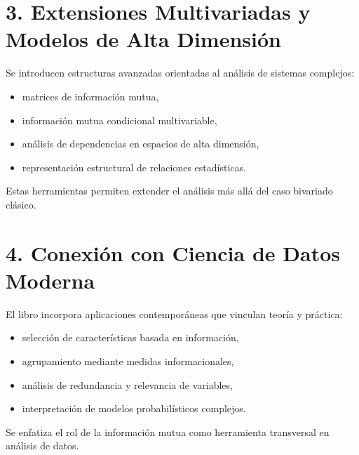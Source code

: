 \documentclass[letterpaper,10pt,english]{jupyterBook}
\begin{document}
\section{3. Extensiones Multivariadas y Modelos de Alta Dimensión}
\label{\detokenize{00_frontmatter/contributions:extensiones-multivariadas-y-modelos-de-alta-dimension}}
\sphinxAtStartPar
Se introducen estructuras avanzadas orientadas al análisis de sistemas complejos:
\begin{itemize}
\item {} 
\sphinxAtStartPar
matrices de información mutua,

\item {} 
\sphinxAtStartPar
información mutua condicional multivariable,

\item {} 
\sphinxAtStartPar
análisis de dependencias en espacios de alta dimensión,

\item {} 
\sphinxAtStartPar
representación estructural de relaciones estadísticas.

\end{itemize}

\sphinxAtStartPar
Estas herramientas permiten extender el análisis más allá del caso bivariado clásico.


\section{4. Conexión con Ciencia de Datos Moderna}
\label{\detokenize{00_frontmatter/contributions:conexion-con-ciencia-de-datos-moderna}}
\sphinxAtStartPar
El libro incorpora aplicaciones contemporáneas que vinculan teoría y práctica:
\begin{itemize}
\item {} 
\sphinxAtStartPar
selección de características basada en información,

\item {} 
\sphinxAtStartPar
agrupamiento mediante medidas informacionales,

\item {} 
\sphinxAtStartPar
análisis de redundancia y relevancia de variables,

\item {} 
\sphinxAtStartPar
interpretación de modelos probabilísticos complejos.

\end{itemize}

\sphinxAtStartPar
Se enfatiza el rol de la información mutua como herramienta transversal en análisis de datos.
\end{document}
